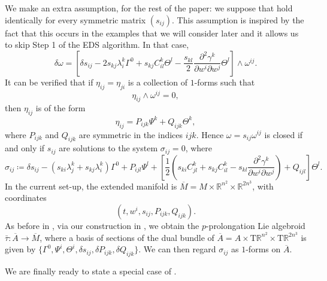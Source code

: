 \documentclass[11pt]{article}
\theoremstyle{plain}
\theoremstyle{definition}
\begin{document}
We make an extra assumption, for the rest of the paper: we suppose that  hold identically for every symmetric matrix $(s_{ij})$. This assumption is inspired by the fact that this occurs in the  examples that we will consider later and it allows us to skip Step 1 of the EDS algorithm. In that case,
\begin{equation*}
    \delta\omega=\left[\delta s_{ij}-2s_{kj}\lambda_i^k \Gamma^0+s_{kj}C_{il}^k \Theta^l-\frac{s_{kl}}{2}\frac{\partial^2 \gamma^k}{\partial w^i \partial w^j}\Theta^l\right]\wedge \omega^{ij}.
\end{equation*}
It can be verified that if $\eta_{ij}=\eta_{ji}$ is a collection of $1$-forms such that
\begin{equation*}
    \eta_{ij}\wedge \omega^{ij}=0,
\end{equation*}
then $\eta_{ij}$ is of the form
\begin{equation*}
    \eta_{ij}=P_{ijk}\Psi^k+Q_{ijk}\Theta^k,
\end{equation*}
where $P_{ijk}$ and $Q_{ijk}$ are symmetric in the indices $ijk$. Hence $\omega=s_{ij}\omega^{ij}$ is closed if and only if $s_{ij}$ are solutions to the system $\sigma_{ij}=0$, where
\begin{equation*}
    \sigma_{ij}\coloneqq \delta s_{ij}-(s_{ki}\lambda_j^k+s_{kj}\lambda_i^k)\Gamma^0+P_{ijl}\Psi^l+\left[\frac{1}{2}\left(s_{ki}C_{jl}^k+s_{kj}C_{il}^k-s_{kl}\frac{\partial^2 \gamma^k}{\partial w^i \partial w^j}\right)+Q_{ijl}\right]\Theta^l.
\end{equation*}
In the current set-up, the extended manifold is $\overline{M}=M\times \mathbb{R}^{n^2}\times \mathbb{R}^{2n^{3}}$, with coordinates
\begin{equation*}
    (t,w^i,s_{ij},P_{ijk},Q_{ijk}).
\end{equation*}
As before in , via our construction in , we obtain the $p$-prolongation Lie algebroid $\bar{\tau}\colon \overline{A}\to \overline{M}$, where a basis of sections of the dual bundle of $\overline{A}=A\times \mathrm{T}\mathbb{R}^{n^2}\times \mathrm{T}\mathbb{R}^{2n^{3}}$ is given by $\{\Gamma^0,\Psi^i,\Theta^i,\delta s_{ij},\delta P_{ijk},\delta Q_{ijk}\}$. We can then regard $\sigma_{ij}$ as $1$-forms on $\overline{A}$.

We are finally ready to state a special case  of .
\end{document}
